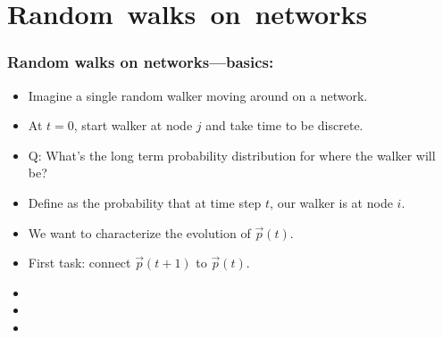 \section{Random\ walks\ on\ networks}


\begin{frame}
  \frametitle{Random walks on networks---basics:}

  \begin{itemize}
  \item<1->
    Imagine a single random walker moving
    around on a network.
  \item<2-> 
    At $t=0$, start walker at node $j$ and 
    take time to be discrete.
  \item<3-> 
    \alert{Q:} What's the long term probability distribution
    for where the walker will be?
  \item<4-> 

    Define  as the probability
    that at time step $t$, our walker is at node $i$.
  \item<5-> 
    We want to characterize the evolution
    of $\vec{p}(t)$.
  \item<6-> 
    First task: connect $\vec{p}(t+1)$ to $\vec{p}(t)$.
  \item<7-> 
  \item<8-> 
  \item<9->
  \end{itemize}

\end{frame}

